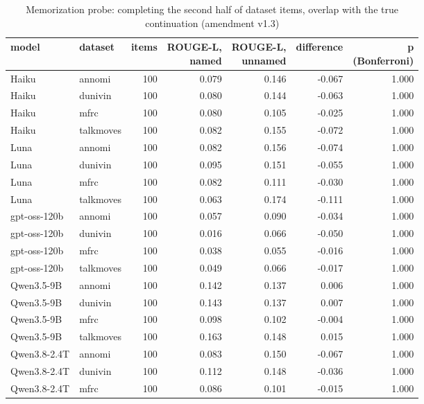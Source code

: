 \begin{table}[t]
\centering
\small
\caption{Memorization probe: completing the second half of dataset items, overlap with the true continuation (amendment v1.3)}
\label{tab:tab15_memorization_completion}
\begin{adjustbox}{max width=\linewidth}
\begin{tabular}{llrrrrr}
\toprule
model & dataset & items & \makecell[br]{ROUGE-L, \\{} named} & \makecell[br]{ROUGE-L, \\{} unnamed} & difference & \makecell[br]{p \\{} (Bonferroni)} \\
\midrule
Haiku & annomi & 100 & 0.079 & 0.146 & -0.067 & 1.000 \\
Haiku & dunivin & 100 & 0.080 & 0.144 & -0.063 & 1.000 \\
Haiku & mfrc & 100 & 0.080 & 0.105 & -0.025 & 1.000 \\
Haiku & talkmoves & 100 & 0.082 & 0.155 & -0.072 & 1.000 \\
Luna & annomi & 100 & 0.082 & 0.156 & -0.074 & 1.000 \\
Luna & dunivin & 100 & 0.095 & 0.151 & -0.055 & 1.000 \\
Luna & mfrc & 100 & 0.082 & 0.111 & -0.030 & 1.000 \\
Luna & talkmoves & 100 & 0.063 & 0.174 & -0.111 & 1.000 \\
gpt-oss-120b & annomi & 100 & 0.057 & 0.090 & -0.034 & 1.000 \\
gpt-oss-120b & dunivin & 100 & 0.016 & 0.066 & -0.050 & 1.000 \\
gpt-oss-120b & mfrc & 100 & 0.038 & 0.055 & -0.016 & 1.000 \\
gpt-oss-120b & talkmoves & 100 & 0.049 & 0.066 & -0.017 & 1.000 \\
Qwen3.5-9B & annomi & 100 & 0.142 & 0.137 & 0.006 & 1.000 \\
Qwen3.5-9B & dunivin & 100 & 0.143 & 0.137 & 0.007 & 1.000 \\
Qwen3.5-9B & mfrc & 100 & 0.098 & 0.102 & -0.004 & 1.000 \\
Qwen3.5-9B & talkmoves & 100 & 0.163 & 0.148 & 0.015 & 1.000 \\
Qwen3.8-2.4T & annomi & 100 & 0.083 & 0.150 & -0.067 & 1.000 \\
Qwen3.8-2.4T & dunivin & 100 & 0.112 & 0.148 & -0.036 & 1.000 \\
Qwen3.8-2.4T & mfrc & 100 & 0.086 & 0.101 & -0.015 & 1.000 \\

\end{tabular}
\end{adjustbox}
\end{table}
